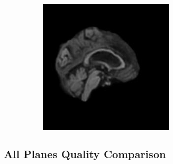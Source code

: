 \documentclass[12pt, fleqn, titlepage]{article}
\newcommand\skipper{1.4pt}
\begin{document}
\begin{figure}[H]
\begin{subfigure}[b]{0.7\textwidth}
		\hskip\skipper
		\includegraphics[width=0.22\linewidth]{imgs/082_S_0469/YZ_model_082_S_0469_yz_3}
	\end{subfigure}
\end{figure}

\subsection{All Planes Quality Comparison}\label{all_generated}
\end{document}
